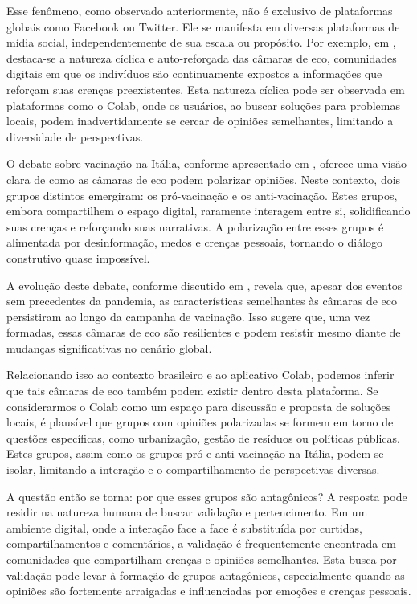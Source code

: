 Esse fenômeno, como observado anteriormente, não é exclusivo de plataformas globais como Facebook ou Twitter. Ele se manifesta em diversas plataformas de mídia social, independentemente de sua escala ou propósito. Por exemplo, em , destaca-se a natureza cíclica e auto-reforçada das câmaras de eco, comunidades digitais em que os indivíduos são continuamente expostos a informações que reforçam suas crenças preexistentes. Esta natureza cíclica pode ser observada em plataformas como o Colab, onde os usuários, ao buscar soluções para problemas locais, podem inadvertidamente se cercar de opiniões semelhantes, limitando a diversidade de perspectivas.

O debate sobre vacinação na Itália, conforme apresentado em , oferece uma visão clara de como as câmaras de eco podem polarizar opiniões. Neste contexto, dois grupos distintos emergiram: os pró-vacinação e os anti-vacinação. Estes grupos, embora compartilhem o espaço digital, raramente interagem entre si, solidificando suas crenças e reforçando suas narrativas. A polarização entre esses grupos é alimentada por desinformação, medos e crenças pessoais, tornando o diálogo construtivo quase impossível.

A evolução deste debate, conforme discutido em , revela que, apesar dos eventos sem precedentes da pandemia, as características semelhantes às câmaras de eco persistiram ao longo da campanha de vacinação. Isso sugere que, uma vez formadas, essas câmaras de eco são resilientes e podem resistir mesmo diante de mudanças significativas no cenário global.

Relacionando isso ao contexto brasileiro e ao aplicativo Colab, podemos inferir que tais câmaras de eco também podem existir dentro desta plataforma. Se considerarmos o Colab como um espaço para discussão e proposta de soluções locais, é plausível que grupos com opiniões polarizadas se formem em torno de questões específicas, como urbanização, gestão de resíduos ou políticas públicas. Estes grupos, assim como os grupos pró e anti-vacinação na Itália, podem se isolar, limitando a interação e o compartilhamento de perspectivas diversas.

A questão então se torna: por que esses grupos são antagônicos? A resposta pode residir na natureza humana de buscar validação e pertencimento. Em um ambiente digital, onde a interação face a face é substituída por curtidas, compartilhamentos e comentários, a validação é frequentemente encontrada em comunidades que compartilham crenças e opiniões semelhantes. Esta busca por validação pode levar à formação de grupos antagônicos, especialmente quando as opiniões são fortemente arraigadas e influenciadas por emoções e crenças pessoais.


